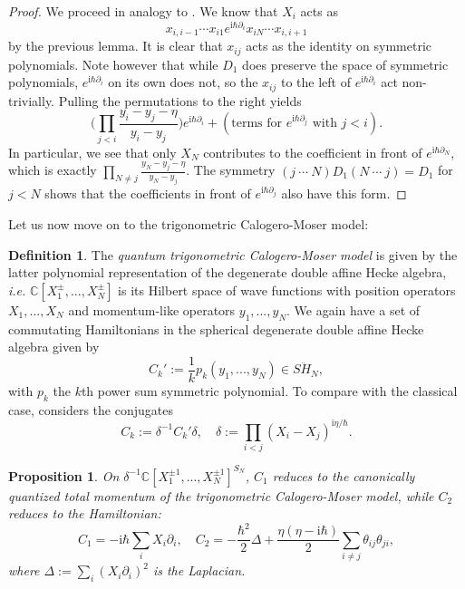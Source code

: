 \documentclass[11pt]{report}
\newtheorem{prop}[theorem]{Proposition}
\theoremstyle{definition}
\newtheorem{definition}[theorem]{Definition}
\theoremstyle{remark}
\theoremstyle{remark}
\newcommand{\C}{\mathbb{C}}
\newcommand{\I}{\mathrm{i}}
\begin{document}
\begin{proof}
We proceed in analogy to \cite{article:jimbo:1995}. We know that $X_i$ acts as
\begin{equation*}
x_{i,i-1} \cdots x_{i1} e^{\I \hbar \partial_i} x_{iN} \cdots x_{i,i+1}
\end{equation*}
by the previous lemma. It is clear that $x_{ij}$ acts as the identity on symmetric polynomials. Note however that while $D_1$ does preserve the space of symmetric polynomials, $e^{\I \hbar \partial_i}$ on its own does not, so the $x_{ij}$ to the left of $e^{\I \hbar \partial_i}$ act non-trivially. Pulling the permutations to the right yields
\begin{equation*}
\bigg( \prod_{j < i} \frac{y_i-y_j-\eta}{y_i-y_j} \bigg) e^{\I \hbar \partial_i} + (\text{terms for } e^{\I \hbar \partial_j} \text{ with } j < i).
\end{equation*}
In particular, we see that only $X_N$ contributes to the coefficient in front of $e^{\I \hbar \partial_N}$, which is exactly $\prod_{N \neq j} \frac{y_N-y_j-\eta}{y_N-y_j}$. The symmetry $(j \ \cdots \ N) D_1 (N \ \cdots \ j) = D_1$ for $j < N$ shows that the coefficients in front of $e^{\I \hbar \partial_j}$ also have this form.
\end{proof}

Let us now move on to the trigonometric Calogero-Moser model:

\begin{definition}
The \emph{quantum trigonometric Calogero-Moser model} is given by the latter polynomial representation of the degenerate double affine Hecke algebra, \emph{i.e.} $\C[X_1^\pm,...,X_N^\pm]$ is its Hilbert space of wave functions with position operators $X_1,...,X_N$ and momentum-like operators $y_1,...,y_N$. We again have a set of commutating Hamiltonians in the spherical degenerate double affine Hecke algebra given by
\begin{equation*}
C_k' := \frac{1}{k} p_k(y_1,...,y_N) \in S\ddot H_N,
\end{equation*}
with $p_k$ the $k$th power sum symmetric polynomial. To compare with the classical case, \cite{article:etingof:2009} considers the conjugates
\begin{equation*}
C_k := \delta^{-1} C_k' \delta, \quad \delta := \prod_{i < j} (X_i-X_j)^{\I \eta / \hbar}.
\end{equation*}
\end{definition}

\begin{prop}\label{prop:trigCMHamiltonian}
On $\delta^{-1} \C[X_1^{\pm 1},...,X_N^{\pm 1}]^{S_N}$, $C_1$ reduces to the canonically quantized total momentum of the trigonometric Calogero-Moser model, while $C_2$ reduces to the Hamiltonian:
\begin{equation*}
C_1 = -\I \hbar \sum_i X_i \partial_i, \quad C_2 = -\frac{\hbar^2}{2} \Delta + \frac{\eta(\eta-\I \hbar)}{2} \sum_{i \neq j} \theta_{ij} \theta_{ji},
\end{equation*}
where $\Delta := \sum_i (X_i \partial_i)^2$ is the Laplacian.
\end{prop}
\end{document}
